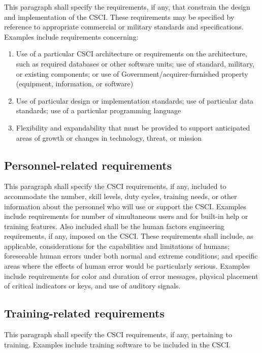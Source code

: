 \documentclass{fidata-report-template}
\begin{document}
This paragraph shall specify the requirements, if any, that constrain
the design and implementation of the CSCI. These requirements may be
specified by reference to appropriate commercial or military standards
and specifications. Examples include requirements concerning:

\begin{enumerate}
\itemsep1pt\parskip0pt
\item
  Use of a particular CSCI architecture or requirements on the
  architecture, such as required databases or other software units; use
  of standard, military, or existing components; or use of
  Government/acquirer-furnished property (equipment, information, or
  software)
\item
  Use of particular design or implementation standards; use of
  particular data standards; use of a particular programming language
\item
  Flexibility and expandability that must be provided to support
  anticipated areas of growth or changes in technology, threat, or
  mission
\end{enumerate}

\subsection{Personnel-related requirements}

This paragraph shall specify the CSCI requirements, if any, included to
accommodate the number, skill levels, duty cycles, training needs, or
other information about the personnel who will use or support the CSCI.
Examples include requirements for number of simultaneous users and for
built-in help or training features. Also included shall be the human
factors engineering requirements, if any, imposed on the CSCI. These
requirements shall include, as applicable, considerations for the
capabilities and limitations of humans; foreseeable human errors under
both normal and extreme conditions; and specific areas where the effects
of human error would be particularly serious. Examples include
requirements for color and duration of error messages, physical
placement of critical indicators or keys, and use of auditory signals.

\subsection{Training-related requirements}

This paragraph shall specify the CSCI requirements, if any, pertaining
to training. Examples include training software to be included in the
CSCI.
\end{document}
